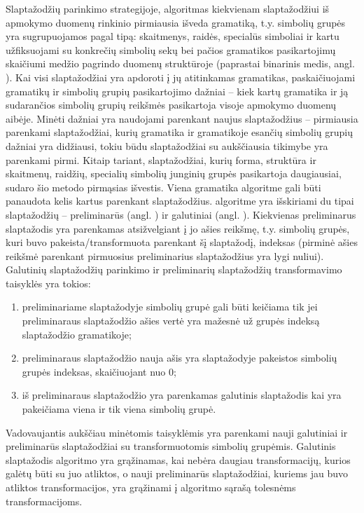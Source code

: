 \documentclass{VUMIFInfBakalaurinis}
\begin{document}
Slaptažodžių parinkimo strategijoje,  algoritmas kiekvienam 
slaptažodžiui iš apmokymo duomenų rinkinio pirmiausia išveda gramatiką, t.y. 
simbolių grupės yra sugrupuojamos pagal tipą: skaitmenys, raidės, specialūs 
simboliai ir kartu užfiksuojami su konkrečių simbolių sekų bei pačios gramatikos 
pasikartojimų skaičiumi medžio pagrindo duomenų struktūroje (paprastai binarinis 
medis, angl. ). Kai visi slaptažodžiai yra apdoroti į jų 
atitinkamas gramatikas, paskaičiuojami gramatikų ir simbolių grupių 
pasikartojimo dažniai -- kiek kartų gramatika ir ją sudarančios simbolių grupių 
reikšmės pasikartoja visoje apmokymo duomenų aibėje. Minėti dažniai yra 
naudojami parenkant naujus slaptažodžius -- pirmiausia parenkami slaptažodžiai, 
kurių gramatika ir gramatikoje esančių simbolių grupių dažniai yra didžiausi, 
tokiu būdu slaptažodžiai su aukščiausia tikimybe yra parenkami pirmi. Kitaip 
tariant, slaptažodžiai, kurių forma, struktūra ir skaitmenų, raidžių, specialių 
simbolių junginių grupės pasikartoja daugiausiai, sudaro šio metodo pirmąsias 
išvestis.
Viena gramatika  algoritme gali būti panaudota kelis kartus 
parenkant slaptažodžius.  algoritme yra išskiriami du tipai 
slaptažodžių -- preliminarūs (angl. ) ir galutiniai 
(angl. ). Kiekvienas preliminarus slaptažodis yra parenkamas 
atsižvelgiant į jo ašies reikšmę, t.y. simbolių grupės, kuri buvo 
pakeista/transformuota parenkant šį slaptažodį, indeksas (pirminė ašies reikšmė 
parenkant pirmuosius preliminarius slaptažodžius yra lygi nuliui). Galutinių 
slaptažodžių parinkimo ir preliminarių slaptažodžių transformavimo taisyklės yra 
tokios:
\begin{enumerate}
  \item preliminariame slaptažodyje simbolių grupė gali būti keičiama tik jei 
    preliminaraus slaptažodžio ašies vertė yra mažesnė už grupės indeksą 
    slaptažodžio gramatikoje;
  \item preliminaraus slaptažodžio nauja ašis yra slaptažodyje pakeistos 
    simbolių grupės indeksas, skaičiuojant nuo 0;
  \item iš preliminaraus slaptažodžio yra parenkamas galutinis slaptažodis kai 
    yra pakeičiama viena ir tik viena simbolių grupė.
\end{enumerate}

Vadovaujantis aukščiau minėtomis taisyklėmis yra parenkami nauji galutiniai ir 
preliminarūs slaptažodžiai su transformuotomis simbolių grupėmis. Galutinis 
slaptažodis algoritmo yra grąžinamas, kai nebėra daugiau transformacijų, kurios 
galėtų būti su juo atliktos, o nauji preliminarūs slaptažodžiai, kuriems jau 
buvo atliktos transformacijos, yra grąžinami į algoritmo sąrašą tolesnėms 
transformacijoms.
\end{document}
